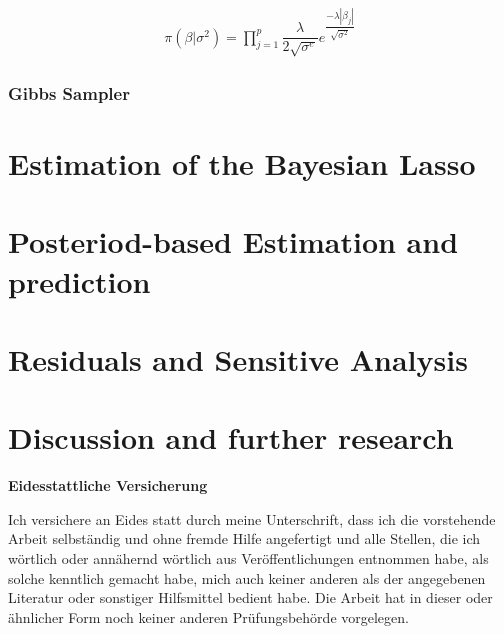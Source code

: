 \documentclass[12pt,a4paper]{article}
\begin{document}
\begin{align} 
\label{eq:la_bay_prior}
 \pi \left( \beta | \sigma^2 \right)   = \prod_{j = 1}^{p} \dfrac{\lambda}{2 \sqrt{\sigma^e}} e^{\dfrac{- \lambda |\beta_j |}{\sqrt{\sigma^2}}} 
\end{align}

\autocite{park_bayesian_2008}

\hypertarget{gibbs-sampler}{%
\subsubsection{Gibbs Sampler}\label{gibbs-sampler}}

\hypertarget{estimation-of-the-bayesian-lasso}{%
\section{Estimation of the Bayesian
Lasso}\label{estimation-of-the-bayesian-lasso}}

\hypertarget{posteriod-based-estimation-and-prediction}{%
\section{Posteriod-based Estimation and
prediction}\label{posteriod-based-estimation-and-prediction}}

\hypertarget{residuals-and-sensitive-analysis}{%
\section{Residuals and Sensitive
Analysis}\label{residuals-and-sensitive-analysis}}

\hypertarget{discussion-and-further-research}{%
\section{Discussion and further
research}\label{discussion-and-further-research}}

\newpage

\renewcommand*{\mkbibnamefamily}[1]{\textbf{#1}}
\renewcommand*{\mkbibnamegiven}[1]{\textbf{#1}}
\renewcommand*{\mkbibnameprefix}[1]{\textbf{#1}}
\renewcommand*{\mkbibnamesuffix}[1]{\textbf{#1}}
\printbibliography[title=References]



\newpage
\textbf{Eidesstattliche Versicherung}

\bigskip

Ich versichere an Eides statt durch meine Unterschrift, dass ich die vorstehende Arbeit selbständig und ohne fremde Hilfe angefertigt und alle Stellen, die ich wörtlich oder annähernd wörtlich aus Veröffentlichungen entnommen habe, als solche kenntlich gemacht habe, mich auch keiner anderen als der angegebenen Literatur oder sonstiger Hilfsmittel bedient habe. Die Arbeit hat in dieser oder ähnlicher Form noch keiner anderen Prüfungsbehörde vorgelegen.

\vspace{1cm}
\rule{0pt}{2\baselineskip} %
\par\noindent{} \hfill\makebox[2.25in]{\hrulefill}%
\par\noindent\makebox[2.25in][l]{} \hfill{}%
\end{document}
